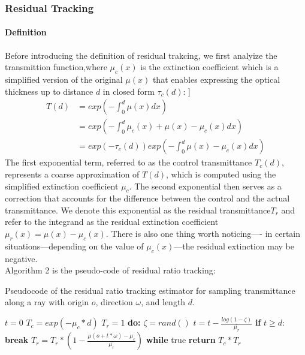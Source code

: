 \documentclass[acmtog]{acmart}
\begin{document}
\subsubsection{Residual Tracking}
\paragraph {\textbf{Definition}}
Before introducing the definition of residual trakcing, we first analyize the transmittion function,where $\mu_c(x)$ is the extinction coefficient which is a simplified version of the original $\mu(x)$ that enables expressing the optical thickness up to distance $d$ in closed form $\tau_c(d)$:
]\begin{equation}
	\begin{aligned}
		T(d)&=exp(-\int_{0}^{d}\mu(x)dx)\\
			&=exp(-\int_{0}^{d}\mu_c(x)+\mu(x)-\mu_c(x)dx)\\
			&=exp(-\tau_c(d)) exp(-\int_0^d\mu(x)-\mu_c(x)dx)
	\end{aligned}
\end{equation}
The first exponential term, referred to as the control transmittance $T_c(d)$, represents a coarse approximation of $T(d)$, which is computed using the simplified extinction coefficient $\mu_c$. The second exponential then serves as a correction that accounts for the difference between the control and the actual transmittance. We denote
this exponential as the residual transmittance$ T_r$ and refer to the integrand as the residual extinction coefficient $\mu_r(x) = \mu(x)-\mu_c(x)$.
There is also one thing worth noticing---- in certain situations—depending on the value of $\mu_c(x)$—the residual extinction may be negative.
\\Algorithm 2 is the pseudo-code of residual ratio tracking:
\begin{algorithm}[h]
	\caption{Pseudocode of the residual ratio tracking estimator for sampling transmittance along a ray with origin $o$, direction $\omega$, and length $d$.}
	\begin{algorithmic}[1]
		\State $t=0$
		\State $T_c=exp(-\mu_c*d)$
		\State $T_r=1$
		\State \textbf{do:}
		\State  \qquad$\zeta=rand() $
		\State  \qquad$t=t-\frac{log(1-\zeta)}{\bar{\mu_r}} $
		\State  \qquad\textbf{if} $t\geq d:$ \textbf{break}
		\State  \qquad$T_r = T_r *(1-\frac{\mu(o+t*\omega)-\mu_c}{\bar{\mu_r}}) $
		\State \textbf{while} true
		\State \textbf{return} $T_c*T_r$
		\EndFunction  
	\end{algorithmic}
\end{algorithm}\\
\end{document}
